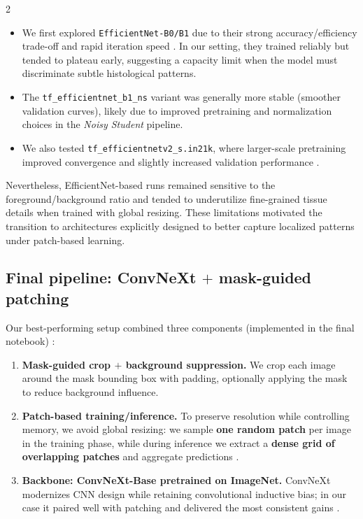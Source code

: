 \documentclass[11pt]{article}
\begin{document}
\begin{multicols}{2}
\begin{itemize}%
    \item We first explored \texttt{EfficientNet-B0/B1} due to their strong accuracy/efficiency trade-off and rapid iteration speed \cite{tan2019efficientnet}. In our setting, they trained reliably but tended to plateau early, suggesting a capacity limit when the model must discriminate subtle histological patterns.
    \item The \texttt{tf\_efficientnet\_b1\_ns} variant was generally more stable (smoother validation curves), likely due to improved pretraining and normalization choices in the \emph{Noisy Student} pipeline.
    \item We also tested \texttt{tf\_efficientnetv2\_s.in21k}, where larger-scale pretraining improved convergence and slightly increased validation performance \cite{tan2021efficientnetv2}.
\end{itemize}
Nevertheless, EfficientNet-based runs remained sensitive to the foreground/background ratio and tended to underutilize fine-grained tissue details when trained with global resizing. These limitations motivated the transition to architectures explicitly designed to better capture localized patterns under patch-based learning.

\subsection{Final pipeline: ConvNeXt $\boldsymbol{+}$ mask-guided patching}
Our best-performing setup combined three components (implemented in the final notebook) :

\begin{enumerate}
    \item \textbf{Mask-guided crop $\boldsymbol{+}$ background suppression.} We crop each image around the mask bounding box with padding, optionally applying the mask to reduce background influence.
    \item \textbf{Patch-based training/inference.} To preserve resolution while controlling memory, we avoid global resizing: we sample \textbf{one random patch} per image in the training phase, while during inference we extract a \textbf{dense grid of overlapping patches} and aggregate predictions \cite{li2019weakly}.
    \item \textbf{Backbone: ConvNeXt-Base pretrained on ImageNet.} ConvNeXt modernizes CNN design while retaining convolutional inductive bias; in our case it paired well with patching and delivered the most consistent gains \cite{liu2022convnext}.
\end{enumerate}


\end{multicols}
\end{document}
